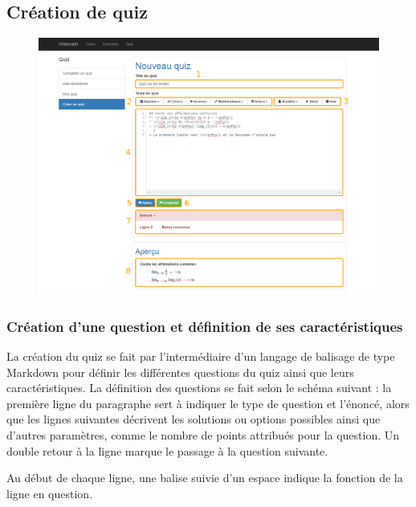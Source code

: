 \documentclass[a4,10pt,french]{sphinxmanual}
\begin{document}
\subsection{Création de quiz}
\label{doc-user:creation-de-quiz}\begin{figure}[htbp]
\centering

\includegraphics{create-doc.png}
\end{figure}


\subsubsection{Création d'une question et définition de ses caractéristiques}
\label{doc-user:creation-d-une-question-et-definition-de-ses-caracteristiques}
La création du quiz se fait par l'intermédiaire d'un langage de balisage de type Markdown pour définir les différentes questions du quiz ainsi que leurs caractéristiques. La définition des questions se fait selon le schéma suivant : la première ligne du paragraphe sert à indiquer le type de question et l'énoncé, alors que les lignes suivantes décrivent les solutions ou options possibles ainsi que d'autres paramètres, comme le nombre de points attribués pour la question. Un double retour à la ligne marque le passage à la question suivante.

Au début de chaque ligne, une balise suivie d'un espace indique la fonction de la ligne en question.
\end{document}
